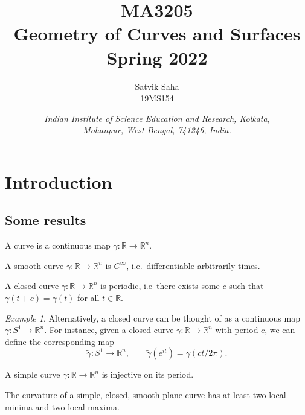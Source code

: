\documentclass[11pt]{article}
\title{
    \Large\textsc{MA3205} \\
    \Huge \textbf{Geometry of Curves and Surfaces} \\
    \vspace{5pt}
    \Large{Spring 2022}
}
\author{
    \large Satvik Saha
    \\\textsc{\small 19MS154}
}
\date{\normalsize
    \textit{Indian Institute of Science Education and Research, Kolkata, \\
    Mohanpur, West Bengal, 741246, India.} \\
}
\newcommand{\R}{\mathbb{R}}
\theoremstyle{definition}
\theoremstyle{remark}
\newtheorem*{example}{Example}
\numberwithin{equation}{section}
\begin{document}
    \maketitle

    \tableofcontents
    
    \section{Introduction}
    
    \subsection{Some results}
    
    \begin{definition}
        A curve is a continuous map $\gamma\colon \R \to \R^n$.
    \end{definition}

    \begin{definition}
        A smooth curve $\gamma\colon \R \to \R^n$ is $C^\infty$, i.e.\ differentiable
        arbitrarily times.
    \end{definition}

    \begin{definition}
        A closed curve $\gamma\colon \R \to \R^n$ is periodic, i.e\ there exists some
        $c$ such that $\gamma(t + c) = \gamma(t)$ for all $t \in \R$.
    \end{definition}
    \begin{example}
        Alternatively, a closed curve can be thought of as a continuous map
        $\gamma\colon S^1 \to \R^n$. For instance, given a closed curve $\gamma\colon
        \R \to \R^n$ with period $c$, we can define the corresponding map \[
            \tilde{\gamma}\colon S^1 \to \R^n, \qquad \tilde{\gamma}(e^{it}) =
            \gamma(ct / 2\pi).
        \] 
    \end{example}

    \begin{definition}
        A simple curve $\gamma\colon \R \to \R^n$ is injective on its period.
    \end{definition}

    \begin{theorem}
        The curvature of a simple, closed, smooth plane curve has at least two local
        minima and two local maxima.
    \end{theorem}
\end{document}
